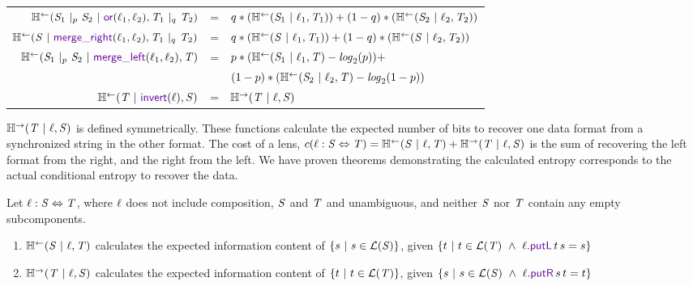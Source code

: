 \documentclass[acmsmall,screen,anonymous]{acmart}
\begin{document}
\begin{center}
\begin{tabular}{rcl}
    $\LEntropyOf{\PRegexOr{\Regex_1}{\Regex_2}{\Probability} \Given \OrLensOf{\Lens_1}{\Lens_2}, \PRegexOr{\RegexAlt_1}{\RegexAlt_2}{\ProbabilityAlt}}$
    & =
    & $q*(\mathbb{H}^\leftarrow(\mathit{S}_1 ~|~ \mathit{\ell}_1, \mathit{T}_1)) + (1-q)*(\mathbb{H}^\leftarrow(\mathit{S}_2 ~|~ \mathit{\ell}_2, \mathit{T}_2))$\\
    
    $\LEntropyOf{\Regex \Given \MergeROf{\Lens_1}{\Lens_2}, \PRegexOr{\RegexAlt_1}{\RegexAlt_2}{\ProbabilityAlt}}$
    & =
    & $q*(\mathbb{H}^\leftarrow(\mathit{S} ~|~ \mathit{\ell}_1, \mathit{T}_1)) + (1-q)*(\mathbb{H}^\leftarrow(\mathit{S} ~|~ \mathit{\ell}_2, \mathit{T}_2))$\\
    
    $\LEntropyOf{\PRegexOr{\Regex_1}{\Regex_2}{\Probability} \Given \MergeLOf{\Lens_1}{\Lens_2}, \RegexAlt}$
    & =
    & $p*(\mathbb{H}^\leftarrow(\mathit{S}_1 ~|~ \mathit{\ell}_1, \mathit{T}) - \mathit{log}_2(p)) + $\\
    &
    & $(1-p)*(\mathbb{H}^\leftarrow(\mathit{S}_2 ~|~ \mathit{\ell}_2, \mathit{T}) - \mathit{log}_2(1 - p))$\\
    
    $\LEntropyOf{\RegexAlt \Given \InvertOf{\Lens}, \Regex}$
    & =
    & $\mathbb{H}^\rightarrow(\mathit{T} ~|~ \mathit{\ell}, \mathit{S})$\\
  \end{tabular}
\end{center}
$\mathbb{H}^\rightarrow(\mathit{T} ~|~ \mathit{\ell}, \mathit{S})$ is defined symmetrically.  These
functions calculate the expected number of bits to recover one data format from
a synchronized string in the other format.
The cost of a lens, $c(\mathit{\ell} : \mathit{S} \Leftrightarrow \mathit{T}) =
\mathbb{H}^\leftarrow(\mathit{S} ~|~ \mathit{\ell}, \mathit{T}) + \mathbb{H}^\rightarrow(\mathit{T} ~|~
  \mathit{\ell}, \mathit{S})$ is the
sum of recovering the left format from the right, and the right from the left.
We have proven theorems demonstrating the calculated entropy corresponds to the
actual conditional entropy to recover the data. 

\begin{theorem}
  Let $\mathit{\ell} : \mathit{S} \Leftrightarrow \mathit{T}$, where $\mathit{\ell}$ does not
  include composition, $\mathit{S}$ and $\mathit{T}$ and unambiguous, and neither
  $\mathit{S}$ nor $\mathit{T}$ contain any empty subcomponents.
  \begin{enumerate}
  \item $\mathbb{H}^\leftarrow(\mathit{S} ~|~ \mathit{\ell}, \mathit{T})$ calculates the expected
    information content of $\{s ~|~ s \in \mathcal{L}(\mathit{S})\}$,
    given $\SetOf{t \SuchThat t \in \LanguageOf{\RegexAlt} \BooleanAnd
      \Lens.\PutLOf{t}{s} = s}$
  \item $\mathbb{H}^\rightarrow(\mathit{T} ~|~ \mathit{\ell}, \mathit{S})$ calculates the expected
    information content of $\{t ~|~ t \in \mathcal{L}(\mathit{T})\}$,
    given $\SetOf{s \SuchThat s \in \LanguageOf{\Regex} \BooleanAnd
      \Lens.\PutROf{s}{t} = t}$
  \end{enumerate}
\end{theorem}
\end{document}

